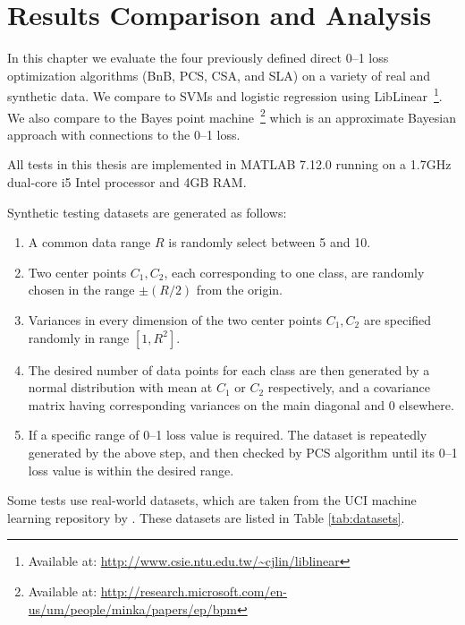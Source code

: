 \section{Results Comparison and Analysis}
\label{cha:results}

In this chapter we evaluate the four previously defined direct 0--1
loss optimization algorithms (BnB, PCS, CSA, and SLA) on a variety of
real and synthetic data.  We compare to SVMs and logistic regression
using LibLinear~\cite{linearSVM}\footnote{Available at:
  \url{http://www.csie.ntu.edu.tw/~cjlin/liblinear}}.  We also compare
to the Bayes point machine~\cite{bpm}\footnote{Available at:
  \url{http://research.microsoft.com/en-us/um/people/minka/papers/ep/bpm}}
which is an approximate Bayesian approach with connections to the 0--1
loss.

All tests in this thesis are implemented in MATLAB 7.12.0 running on a
1.7GHz dual-core i5 Intel processor and 4GB RAM.

Synthetic testing datasets are generated as follows: 
\begin{enumerate}
  \setlength{\itemsep}{4pt}
  \setlength{\parskip}{1pt}
  \setlength{\parsep}{1pt}
	\item A common data range $R$ is randomly select between 5 and 10. 
	\item Two center points $C_1, C_2$, each corresponding to one class, are randomly chosen in the range $\pm (R/2)$ from the origin. 
	\item Variances in every dimension of the two center points $C_1, C_2$ are specified randomly in range $[1, R^2]$. 
	\item The desired number of data points for each class are then generated by a normal distribution with mean at $C_1$ or $C_2$ respectively, and a covariance matrix having corresponding variances on the main diagonal and 0 elsewhere.     
	\item If a specific range of 0--1 loss value is required. The dataset is repeatedly generated by the above step, and then checked by PCS algorithm until its 0--1 loss value is within the desired range.
\end{enumerate}

Some tests use real-world datasets, which are taken from the UCI
machine learning repository by \cite{ucidata}. These datasets are
listed in Table \ref{tab:datasets}.

